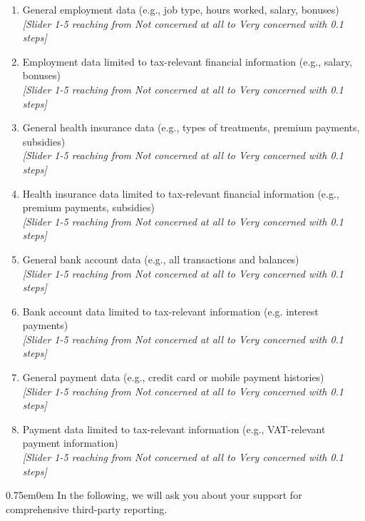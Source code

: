 \documentclass[11pt]{article}
\begin{document}
\begin{enumerate}[resume]
\begin{enumerate}[label=\alph*)]
        \item General employment data (e.g., job type, hours worked, salary, bonuses)\\
        \textit{[Slider 1-5 reaching from Not concerned at all to Very concerned with 0.1 steps]}
        \item Employment data limited to tax-relevant financial information (e.g., salary, bonuses)\\
        \textit{[Slider 1-5 reaching from Not concerned at all to Very concerned with 0.1 steps]}
        \item General health insurance data (e.g., types of treatments, premium payments, subsidies)\\
        \textit{[Slider 1-5 reaching from Not concerned at all to Very concerned with 0.1 steps]}
        \item Health insurance data limited to tax-relevant financial information (e.g., premium payments, subsidies)\\
        \textit{[Slider 1-5 reaching from Not concerned at all to Very concerned with 0.1 steps]}
        \item General bank account data (e.g., all transactions and balances)\\
        \textit{[Slider 1-5 reaching from Not concerned at all to Very concerned with 0.1 steps]}
        \item Bank account data limited to tax-relevant information (e.g. interest payments)\\
        \textit{[Slider 1-5 reaching from Not concerned at all to Very concerned with 0.1 steps]}
        \item General payment data (e.g., credit card or mobile payment histories)\\
        \textit{[Slider 1-5 reaching from Not concerned at all to Very concerned with 0.1 steps]}
        \item Payment data limited to tax-relevant information (e.g., VAT-relevant payment information)\\
        \textit{[Slider 1-5 reaching from Not concerned at all to Very concerned with 0.1 steps]}
\end{enumerate}
\end{enumerate}
\begin{adjustwidth}{0.75em}{0em} In the following, we will ask you about your support for comprehensive third-party reporting. \end{adjustwidth}
\end{document}
